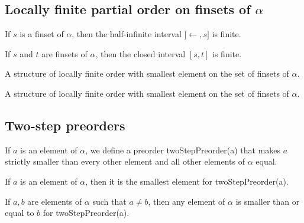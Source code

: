 \subsection{Locally finite partial order on finsets of $\alpha$}

\begin{sublemma}
If $s$ is a finset of $\alpha$, then the half-infinite interval $]\leftarrow,s]$ is finite.

\end{sublemma}

\begin{sublemma}
If $s$ and $t$ are finsets of $\alpha$, then the closed interval $[s,t]$ is finite.

\end{sublemma}

\begin{subdefi}[FinsetLFB]
A structure of locally finite order with smallest element on the set of finsets of $\alpha$.

\end{subdefi}

\begin{subdefi}[FacePosetLF]
A structure of locally finite order with smallest element on the set of finsets of $\alpha$.

\end{subdefi}

\subsection{Two-step preorders}

\begin{subdefi}[twoStepPreorder]
If $a$ is an element of $\alpha$, we define a preorder twoStepPreorder(a) that makes $a$ strictly smaller than every other element
and all other elements of $\alpha$ equal.

\end{subdefi}

\begin{sublemma}
If $a$ is an element of $\alpha$, then it is the smallest element for twoStepPreorder(a).

\end{sublemma}

\begin{sublemma}
If $a,b$ are elements of $\alpha$ such that $a\ne b$, then any element of $\alpha$ is smaller than or equal to
$b$ for twoStepPreorder(a).

\end{sublemma}

